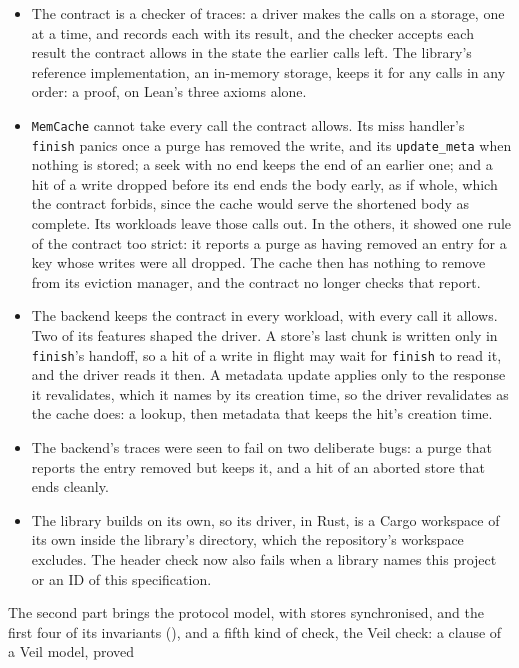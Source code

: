 \begin{itemize}
  \item The contract is a checker of traces: a driver makes the calls on a
    storage, one at a time, and records each with its result, and the
    checker accepts each result the contract allows in the state the
    earlier calls left. The library's reference implementation, an
    in-memory storage, keeps it for any calls in any order: a proof, on
    Lean's three axioms alone.
  \item \texttt{MemCache} cannot take every call the contract allows. Its
    miss handler's \texttt{finish} panics once a purge has removed the
    write, and its \texttt{update\_meta} when nothing is stored; a seek
    with no end keeps the end of an earlier one; and a hit of a write
    dropped before its end ends the body early, as if whole, which the
    contract forbids, since the cache would serve the shortened body as
    complete. Its workloads leave those calls out. In the others, it showed
    one rule of the contract too strict: it reports a purge as having
    removed an entry for a key whose writes were all dropped. The cache
    then has nothing to remove from its eviction manager, and the contract
    no longer checks that report.
  \item The backend keeps the contract in every workload, with every call
    it allows. Two of its features shaped the driver. A store's last chunk
    is written only in \texttt{finish}'s handoff, so a hit of a write in
    flight may wait for \texttt{finish} to read it, and the driver reads it
    then. A metadata update applies only to the response it revalidates,
    which it names by its creation time, so the driver revalidates as the
    cache does: a lookup, then metadata that keeps the hit's creation time.
  \item The backend's traces were seen to fail on two deliberate bugs: a
    purge that reports the entry removed but keeps it, and a hit of an
    aborted store that ends cleanly.
  \item The library builds on its own, so its driver, in Rust, is a Cargo
    workspace of its own inside the library's directory, which the
    repository's workspace excludes. The header check now also fails when
    a library names this project or an ID of this specification.
\end{itemize}
The second part brings the protocol model, with stores synchronised, and
the first four of its invariants (), and a
fifth kind of check, the Veil check: a clause of a Veil model, proved
